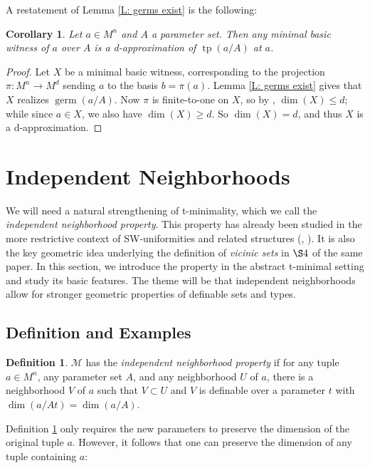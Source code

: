 \documentclass{amsart}
\newtheorem{corollary}[theorem]{Corollary}
\theoremstyle{definition}
\newtheorem{definition}[theorem]{Definition}
\newcommand{\tp}{\operatorname{tp}}
\begin{document}
A restatement of Lemma \ref{L: germs exist} is the following:

\begin{corollary}\label{C: minimal witness is d-app}
    Let $a\in M^n$ and $A$ a parameter set. Then any minimal basic witness of $a$ over $A$ is a d-approximation of $\tp(a/A)$ at $a$.
\end{corollary}
\begin{proof}
    Let $X$ be a minimal basic witness, corresponding to the projection $\pi:M^n\rightarrow M^d$ sending $a$ to the basis $b=\pi(a)$. Lemma \ref{L: germs exist} gives that $X$ realizes $\operatorname{germ}(a/A)$. Now $\pi$ is finite-to-one on $X$, so by \cite[Theorem 1.7(10)]{t-minimal-johnson}, $\dim(X)\leq d$; while since $a\in X$, we also have $\dim(X)\geq d$. So $\dim(X)=d$, and thus $X$ is a d-approximation.
\end{proof}

\section{Independent Neighborhoods}

We will need a natural strengthening of t-minimality, which we call the \textit{independent neighborhood property}. This property has already been studied in the more restrictive context of SW-uniformities and related structures (\cite{HaHaPeVF}, \cite[\S 3.1]{HaHaPeGps}).  It is also the key geometric idea underlying the definition of \emph{vicinic sets} in $\S 4$ of the same paper. In this section, we introduce the property in the abstract t-minimal setting and study its basic features. The theme will be that independent neighborhoods allow for stronger geometric properties of definable sets and types.

\subsection{Definition and Examples}

\begin{definition}\label{D: inp}
    $\mathcal M$ has the \textit{independent neighborhood property} if for any tuple $a\in M^n$, any parameter set $A$, and any neighborhood $U$ of $a$, there is a neighborhood $V$ of $a$ such that $V\subset U$ and $V$ is definable over a parameter $t$ with $\dim(a/At)=\dim(a/A)
    $.  
\end{definition}

Definition \ref{D: inp} only requires the new parameters to preserve the dimension of the original tuple $a$. However, it follows that one can preserve the dimension of any tuple containing $a$:
\end{document}
